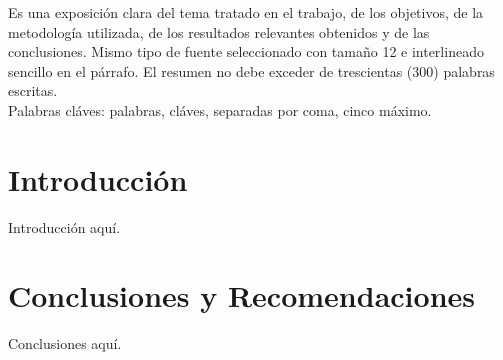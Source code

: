 \documentclass[pregrado]{tesis-usb}
\begin{document}
\frontmatter
\maketitle
\begin{resumen}
     Es una exposición clara del tema tratado en el trabajo, de los objetivos, de la metodología utilizada, de los resultados relevantes obtenidos y de las conclusiones. Mismo tipo de fuente seleccionado con tamaño 12 e interlineado sencillo en el párrafo. El resumen no debe exceder de trescientas (300) palabras escritas. \\
     Palabras cláves: palabras, cláves, separadas por coma, cinco máximo.
\end{resumen}
\tableofcontents

\mainmatter
\chapter*{Introducción}
\par Introducción aquí.





\chapter*{Conclusiones y Recomendaciones}
\par Conclusiones aquí.
\nocite{*}

\end{document}
